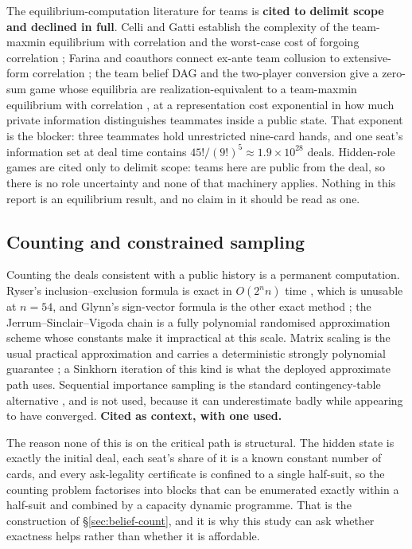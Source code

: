 The equilibrium-computation literature for teams is \textbf{cited to delimit
scope and declined in full}. Celli and Gatti establish the complexity of the
team-maxmin equilibrium with correlation and the worst-case cost of forgoing
correlation \cite{celli-gatti}; Farina and coauthors connect ex-ante team
collusion to extensive-form correlation \cite{farina-collusion}; the team belief
DAG and the two-player conversion give a zero-sum game whose equilibria are
realization-equivalent to a team-maxmin equilibrium with correlation
\cite{zhang-tbdag,carminati-tpi}, at a representation cost exponential in how
much private information distinguishes teammates inside a public state. That
exponent is the blocker: three teammates hold unrestricted nine-card hands, and
one seat's information set at deal time contains
$45!/(9!)^5 \approx 1.9 \times 10^{28}$ deals. Hidden-role games
\cite{carminati2024hiddenrole} are cited only to delimit scope: teams here are
public from the deal, so there is no role uncertainty and none of that machinery
applies. Nothing in this report is an equilibrium result, and no claim in it
should be read as one.

\subsection{Counting and constrained sampling}
\label{app:rel-counting}

Counting the deals consistent with a public history is a permanent computation.
Ryser's inclusion--exclusion formula is exact in $O(2^n n)$ time \cite{ryser},
which is unusable at $n = 54$, and Glynn's sign-vector formula is the other
exact method \cite{glynn}; the Jerrum--Sinclair--Vigoda chain is a fully
polynomial randomised approximation scheme \cite{jsv} whose constants make it
impractical at this scale. Matrix scaling is the usual practical approximation
and carries a deterministic strongly polynomial guarantee \cite{lsw}; a Sinkhorn
iteration of this kind is what the deployed approximate path uses. Sequential
importance sampling is the standard contingency-table alternative
\cite{chen-sis}, and is not used, because it can underestimate badly while
appearing to have converged. \textbf{Cited as context, with one used.}

The reason none of this is on the critical path is structural. The hidden state
is exactly the initial deal, each seat's share of it is a known constant number
of cards, and every ask-legality certificate is confined to a single half-suit,
so the counting problem factorises into blocks that can be enumerated exactly
within a half-suit and combined by a capacity dynamic programme. That is the
construction of \S\ref{sec:belief-count}, and it is why this study can ask
whether exactness helps rather than whether it is affordable.

